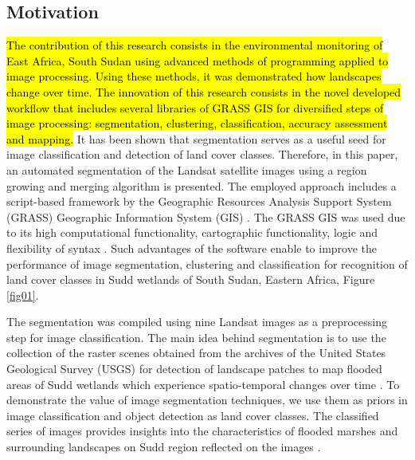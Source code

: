 \documentclass[analytics,article,submit,pdftex,moreauthors]{Definitions/mdpi}
\begin{document}
\subsection{Motivation} 

\hl{The contribution of this research consists in the environmental monitoring of East Africa, South Sudan using advanced methods of programming applied to image processing. Using these methods, it was demonstrated how landscapes change over time. The innovation of this research consists in the novel developed workflow that includes several libraries of GRASS GIS for diversified steps of image processing: segmentation, clustering, classification, accuracy assessment and mapping. }It has been shown that segmentation serves as a useful seed for image classification and detection of land cover classes. Therefore, in this paper, an automated segmentation of the Landsat satellite images using a region growing and merging algorithm is presented. The employed approach includes a script-based framework by the Geographic Resources Analysis Support System (GRASS) Geographic Information System (GIS) \cite{Neteleretal2008}. The GRASS GIS was used due to its high computational functionality, cartographic functionality, logic and flexibility of syntax \cite{NetelerMitasova2008}. Such advantages of the software enable to improve the performance of image segmentation, clustering and classification for recognition of land cover classes in Sudd wetlands of South Sudan, Eastern Africa, Figure \ref{fig01}. 

The segmentation was compiled using nine Landsat images as a preprocessing step for image classification. The main idea behind segmentation is to use the collection of the raster scenes obtained from the archives of the United States Geological Survey (USGS) for detection of landscape patches to map flooded areas of Sudd wetlands which experience spatio-temporal changes over time \cite{Petersen,SOSNOWSKI201651,Mulatu}. To demonstrate the value of image segmentation techniques, we use them as priors in image classification and object detection as land cover classes. The classified series of images provides insights into the characteristics of flooded marshes and surrounding landscapes on Sudd region reflected on the images \cite{CHEN201417}. 
\end{document}

